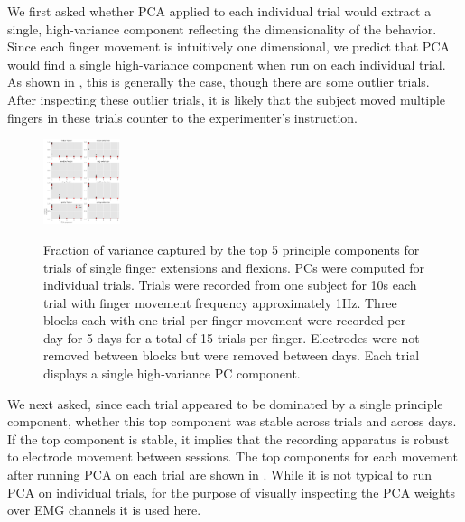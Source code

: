 \documentclass[../main.tex]{subfiles}
\begin{document}
We first asked whether PCA applied to each individual trial would extract a single, high-variance component reflecting the dimensionality of the behavior. Since each finger movement is intuitively one dimensional, we predict that PCA would find a single high-variance component when run on each individual trial. As shown in , this is generally the case, though there are some outlier trials. After inspecting these outlier trials, it is likely that the subject moved multiple fingers in these trials counter to the experimenter's instruction.

\begin{figure}
\label{fig:PCA_variances}
\centering
\includegraphics[width=0.2\textwidth]{images/data_analysis/fingers/PCA_variances.pdf}
\caption{Fraction of variance captured by the top 5 principle components for trials of single finger extensions and flexions. PCs were computed for individual trials. Trials were recorded from one subject for 10s each trial with finger movement frequency approximately 1Hz. Three blocks each with one trial per finger movement were recorded per day for 5 days for a total of 15 trials per finger. Electrodes were not removed between blocks but were removed between days. Each trial displays a single high-variance PC component.}\label{fig:PCA_variances}
\end{figure}

We next asked, since each trial appeared to be dominated by a single principle component, whether this top component was stable across trials and across days. If the top component is stable, it implies that the recording apparatus is robust to electrode movement between sessions. The top components for each movement after running PCA on each trial are shown in . While it is not typical to run PCA on individual trials, for the purpose of visually inspecting the PCA weights over EMG channels it is used here.
\end{document}
